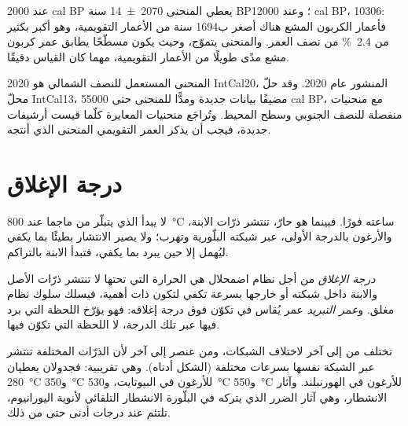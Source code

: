 عند \num{2000} cal BP يعطي المنحنى \num[uncertainty-mode=separate]{2070 \pm 14} سنة BP؛ وعند \num{12000} cal BP، \num{10306}: فأعمار الكربون المشع هناك أصغر ب\num{1694} سنة من الأعمار التقويمية، وهو أكبر بكثير من \qty{2.4}{\percent} من نصف العمر. والمنحنى يتموّج، وحيث يكون مسطّحًا يطابق عمر كربون مشع مدًى طويلًا من الأعمار التقويمية، مهما كان القياس دقيقًا.

\begin{dated}{2020}
المنحنى المستعمل للنصف الشمالي هو IntCal20، المنشور عام 2020. وقد حلّ محلّ IntCal13، مضيفًا بيانات جديدة ومدًّا للمنحنى حتى \num{55000} cal BP، مع منحنيات منفصلة للنصف الجنوبي وسطح المحيط. وتُراجَع منحنيات المعايرة كلّما قيست أرشيفات جديدة، فيجب أن يذكر العمر التقويمي المنحنى الذي أنتجه.
\end{dated}

\section{درجة الإغلاق}\label{sec:b1:radiometric-methods:closure}

لا يبدأ  الذي يتبلّر من ماجما عند \qty{800}{\celsius} ساعته فورًا. فبينما هو حارّ، تنتشر ذرّات الابنة، والأرغون بالدرجة الأولى، عبر شبكته البلّورية وتهرب؛ ولا يصير الانتشار بطيئًا بما يكفي ليُهمل إلا حين يبرد بما يكفي، فتبدأ الابنة بالتراكم.

\begin{definition}\label{def:b1:radiometric-methods:closure}
\emph{درجة الإغلاق}  من أجل نظام اضمحلال هي الحرارة التي تحتها لا تنتشر ذرّات الأصل والابنة داخل شبكته أو خارجها بسرعة تكفي لتكون ذات أهمية، فيسلك  سلوك نظام مغلق. و\emph{عمر التبريد} عمر يُقاس في  تكوّن فوق درجة إغلاقه: فهو يؤرّخ اللحظة التي برد فيها  عبر تلك الدرجة، لا اللحظة التي تكوّن فيها.
\end{definition}

تختلف  من  إلى آخر لاختلاف الشبكات، ومن عنصر إلى آخر لأن الذرّات المختلفة تنتشر عبر الشبكة نفسها بسرعات مختلفة (الشكل أدناه). وهي تقريبية: فجدولان يعطيان \qty{280}{\celsius} و\qty{350}{\celsius} للأرغون في البيوتايت، و\qty{530}{\celsius} و\qty{550}{\celsius} للأرغون في الهورنبلند. وآثار الانشطار، وهي آثار الضرر الذي يتركه في البلّورة الانشطار التلقائي لأنوية اليورانيوم، تلتئم عند درجات أدنى حتى من ذلك.

